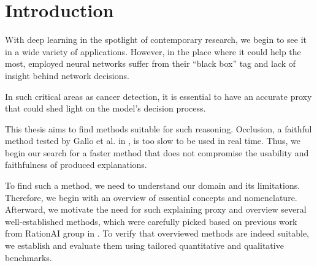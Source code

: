 \chapter{Introduction}\label{chap:introduction}

With deep learning in the spotlight of contemporary research, we begin to see it in a wide variety of applications.
However, in the place where it could help the most, employed neural networks suffer from their ``black box'' tag and lack of insight behind network decisions.

In such critical areas as cancer detection, it is essential to have an accurate proxy that could shed light on the model's decision process.

This thesis aims to find methods suitable for such reasoning.
Occlusion, a faithful method tested by Gallo et al. in \cite{gallo}, is too slow to be used in real time.
Thus, we begin our search for a faster method that does not compromise the usability and faithfulness of produced explanations.

To find such a method, we need to understand our domain and its limitations.
Therefore, we begin with an overview of essential concepts and nomenclature.
Afterward, we motivate the need for such explaining proxy and overview several well-established methods, which were carefully picked based on previous work from RationAI group in \cite{gallo, bajger-grad-cam, krajnansky-grad-cam, hruska-grad-cam}.
To verify that overviewed methods are indeed suitable, we establish and evaluate them using tailored quantitative and qualitative benchmarks.
